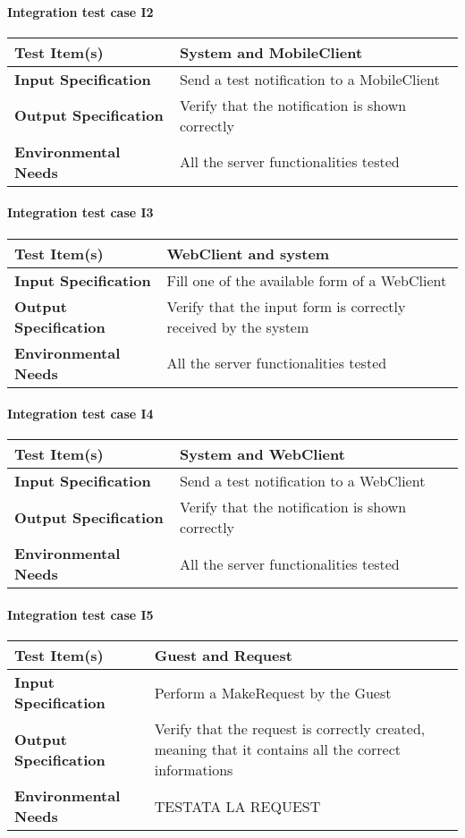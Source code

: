 \paragraph{Integration test case I2}
\begin{tabular}{l | l}
	\hline
	\textbf{Test Item(s)} & System and MobileClient \\
	\hline
	\textbf{Input Specification} & Send a test notification to a MobileClient \\
	\hline
	\textbf{Output Specification} & Verify that the notification is shown correctly \\
	\hline
	\textbf{Environmental Needs} & All the server functionalities tested \\
\end{tabular}

\paragraph{Integration test case I3}
\begin{tabular}{l | l}
	\hline
	\textbf{Test Item(s)} & WebClient and system \\
	\hline
	\textbf{Input Specification} & Fill one of the available form of a WebClient \\
	\hline
	\textbf{Output Specification} & Verify that the input form is correctly received by the system \\
	\hline
	\textbf{Environmental Needs} & All the server functionalities tested \\
	\end{tabular}

\paragraph{Integration test case I4}
\begin{tabular}{l | l}
	\hline
	\textbf{Test Item(s)} & System and WebClient \\
	\hline
	\textbf{Input Specification} & Send a test notification to a WebClient \\
	\hline
	\textbf{Output Specification} & Verify that the notification is shown correctly \\
	\hline
	\textbf{Environmental Needs} &  All the server functionalities tested \\
	\end{tabular}

\paragraph{Integration test case I5}
\begin{tabular}{l | l}
	\hline
	\textbf{Test Item(s)} & Guest and Request \\
	\hline
	\textbf{Input Specification} & Perform a MakeRequest by the Guest \\
	\hline
	\textbf{Output Specification} & Verify that the request is correctly created, meaning that it contains all the correct informations \\
	\hline
	\textbf{Environmental Needs} & TESTATA LA REQUEST  \\
	\end{tabular}

